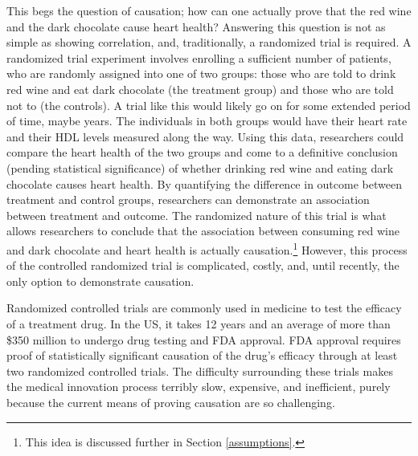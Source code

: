 This begs the question of causation; how can one actually prove that the red wine and the dark chocolate cause heart health?  Answering this question is not as simple as showing correlation, and, traditionally, a randomized trial is required.  A randomized trial experiment involves enrolling a sufficient number of patients, who are randomly assigned into one of two groups: those who are told to drink red wine and eat dark chocolate (the treatment group) and those who are told not to (the controls).  A trial like this would likely go on for some extended period of time, maybe years.  The individuals in both groups would have their heart rate and their HDL levels measured along the way.  Using this data, researchers could compare the heart health of the two groups and come to a definitive conclusion (pending statistical significance) of whether drinking red wine and eating dark chocolate causes heart health.  By quantifying the difference in outcome between treatment and control groups, researchers can demonstrate an association between treatment and outcome.  The randomized nature of this trial is what allows researchers to conclude that the association between consuming red wine and dark chocolate and heart health is actually causation.\footnote{This idea is discussed further in Section \ref{assumptions}.} However, this process of the controlled randomized trial is complicated, costly, and, until recently, the only option to demonstrate causation.  
 
Randomized controlled trials are commonly used in medicine to test the efficacy of a treatment drug.  In the US, it takes 12 years and an average of more than \$350 million to undergo drug testing and FDA approval.\cite{drugapproval}  FDA approval requires proof of statistically significant causation of the drug's efficacy through at least two randomized controlled trials.  The difficulty surrounding these trials makes the medical innovation process terribly slow, expensive, and inefficient, purely because the current means of proving causation are so challenging.  
 
